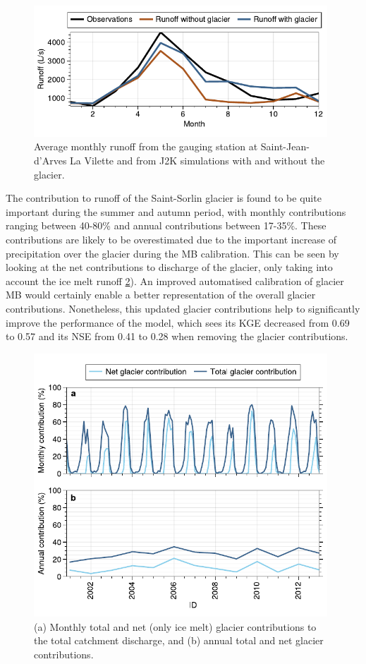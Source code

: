 \begin{figure}[h]
\centering
\includegraphics[width=11cm]{Figures/hydro/Figure_5.pdf}
\caption{Average monthly runoff from the gauging station at Saint-Jean-d'Arves La Vilette and from J2K simulations with and without the glacier.} 
\label{hydro:fig5}
\end{figure}

The contribution to runoff of the Saint-Sorlin glacier is found to be quite important during the summer and autumn period, with monthly contributions ranging between 40-80\% and annual contributions between 17-35\%. These contributions are likely to be overestimated due to the important increase of precipitation over the glacier during the MB calibration. This can be seen by looking at the net contributions to discharge of the glacier, only taking into account the ice melt runoff \ref{hydro:fig6}). An improved automatised calibration of glacier MB would certainly enable a better representation of the overall glacier contributions. Nonetheless, this updated glacier contributions help to significantly improve the performance of the model, which sees its KGE decreased from 0.69 to 0.57 and its NSE from 0.41 to 0.28 when removing the glacier contributions. 

\begin{figure}[h]
\centering
\includegraphics[width=11cm]{Figures/hydro/Figure_6.pdf}
\caption{(a) Monthly total and net (only ice melt) glacier contributions to the total catchment discharge, and (b) annual total and net glacier contributions.} 
\label{hydro:fig6}
\end{figure}

